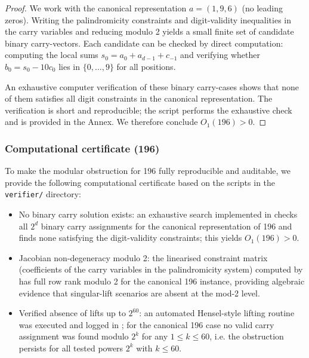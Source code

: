 \documentclass[12pt,a4paper]{article}
\begin{document}
\begin{proof}
We work with the canonical representation $a=(1,9,6)$ (no leading zeros). Writing the palindromicity constraints and digit-validity inequalities in the carry variables and reducing modulo 2 yields a small finite set of candidate binary carry-vectors. Each candidate can be checked by direct computation: computing the local sums $s_0=a_0+a_{d-1}+c_{-1}$ and verifying whether $b_0=s_0-10c_0$ lies in $\{0,\ldots,9\}$ for all positions.

An exhaustive computer verification of these binary carry-cases shows that none of them satisfies all digit constraints in the canonical representation. The verification is short and reproducible; the script \texttt{} performs the exhaustive check and is provided in the Annex. We therefore conclude $O_1(196)>0$.
\end{proof}

\subsubsection*{Computational certificate (196)}
To make the modular obstruction for 196 fully reproducible and auditable, we provide the following computational certificate based on the scripts in the \texttt{verifier/} directory:
\begin{itemize}
\item No binary carry solution exists: an exhaustive search implemented in \texttt{} checks all $2^d$ binary carry assignments for the canonical representation of 196 and finds none satisfying the digit-validity constraints; this yields $O_1(196)>0$.
\item Jacobian non-degeneracy modulo 2: the linearised constraint matrix (coefficients of the carry variables in the palindromicity system) computed by \texttt{} has full row rank modulo 2 for the canonical 196 instance, providing algebraic evidence that singular-lift scenarios are absent at the mod-2 level.
\item Verified absence of lifts up to $2^{60}$: an automated Hensel-style lifting routine was executed and logged in \texttt{}; for the canonical 196 case no valid carry assignment was found modulo $2^k$ for any $1\le k\le 60$, i.e. the obstruction persists for all tested powers $2^k$ with $k\le 60$.
\end{itemize}
\end{document}
